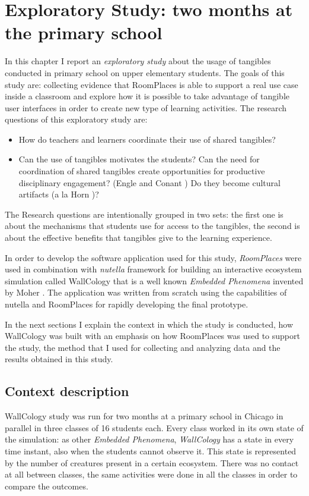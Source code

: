 \chapter{Exploratory Study: two months at the primary school}

\label{chap:user_study}

In this chapter I report an \textit{exploratory study} about the usage of tangibles conducted in primary school on upper elementary students. The goals of this study are: collecting evidence that RoomPlaces is able to support a real use case inside a classroom and explore how it is possible to take advantage of tangible user interfaces in order to create new type of learning activities. The research questions of this exploratory study are:

\begin{itemize}
\item How do teachers and learners coordinate their use of shared tangibles?
\item Can the use of tangibles motivates the students? Can the need for coordination of shared tangibles create opportunities for productive disciplinary engagement? (Engle and Conant \cite{engle:guiding}) Do they become cultural artifacts (a la Horn \cite{horn:role})?
\end{itemize}

The Research questions are intentionally grouped in two sets: the first one is about the mechanisms that students use for access to the tangibles, the second is about the effective benefits that tangibles give to the learning experience.

 In order to develop the software application used for this study, \textit{RoomPlaces} were used in combination with \textit{nutella} framework for building an interactive ecosystem simulation called WallCology that is a well known \textit{Embedded Phenomena} invented by Moher \cite{moher:wallcology}. The application was written from scratch using the capabilities of nutella and RoomPlaces for rapidly developing the final prototype.

In the next sections I explain the context in which the study is conducted, how WallCology was built with an emphasis on how RoomPlaces was used to support the study, the method that I used for collecting and analyzing data and the results obtained in this study.

\section{Context description}
WallCology study was run for two months at a primary school in Chicago in parallel in three classes of 16 students each. Every class worked in its own state of the simulation: as other \textit{Embedded Phenomena}, \textit{WallCology} has a state in every time instant, also when the students cannot observe it. This state is represented by the number of creatures present in a certain ecosystem. There was no contact at all between classes, the same activities were done in all the classes in order to compare the outcomes.

